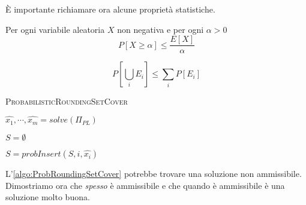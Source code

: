 \`E importante richiamare ora alcune proprietà statistiche.
\begin{theorem}\label{thm:markov}
	Per ogni variabile aleatoria $X$ non negativa e per ogni $\alpha > 0$
	$$
		P[X \geq \alpha] \leq \frac{E[X]}{\alpha}
	$$
\end{theorem}

\begin{theorem}\label{thm:boole}
	$$
		P[\bigcup_{i} E_i] \leq \sum_i P[E_i]
	$$
\end{theorem}

\begin{algorithm}[h]
	\caption{\textsc{ProbabilisticRoundingSetCover}}
	\label{algo:ProbRoundingSetCover}

	$\hat{x_1}, \cdots, \hat{x_m} = solve(\Pi_{PL}) $

	$S =  \emptyset$

	{

		{
			$S = probInsert(S, i, \hat{x_i})$
		}
	}

\end{algorithm}

L'\cref{algo:ProbRoundingSetCover} potrebbe trovare una soluzione non ammissibile. Dimostriamo
ora che \textit{spesso} è ammissibile e che quando è ammissibile è una soluzione molto buona.

